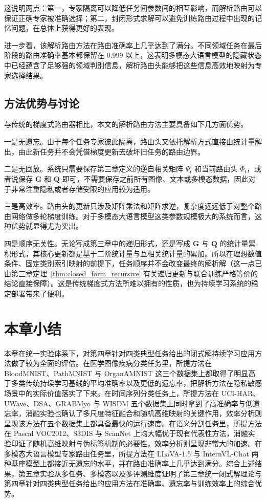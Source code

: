这说明两点：第一，专家隔离可以降低任务间参数间的相互影响，而解析路由可以保证正确专家被准确选择；第二，封闭形式求解可以避免训练路由过程中出现的记忆问题，在总体上获得更好的表现。

进一步看，该解析路由方法在路由准确率上几乎达到了满分。不同领域任务在最后阶段的路由准确率基本都保留在 0.999 以上，这表明多模态大语言模型的隐藏状态中已经蕴含了足够强的领域判别信息，解析路由头能够把这些信息高效地映射为专家选择结果。

\subsection{方法优势与讨论}

与传统的梯度式路由器相比，本文的解析路由方法主要具备如下几方面优势。

一是无遗忘。由于每个任务专家彼此隔离，路由头又依托解析方式直接由统计量解出，由此新任务并不会凭借梯度更新去破坏旧任务的路由边界。

二是无回放。系统只需要保存第三章定义的逆自相关矩阵 $\Psi_t$ 和当前路由头 $\widehat{\Phi}_t$，或者说保存 $\mathbf{G}$ 和 $\mathbf{Q}$ 即可，不需要保存之前所有图像、文本或多模态数据，因此对于非常注重隐私或者存储受限的应用较为适用。

三是高效率。路由头的更新只涉及矩阵乘法和矩阵求逆，复杂度远远低于对整个路由网络做多轮梯度训练。对于多模态大语言模型这类参数规模极大的系统而言，这种优势就显得尤为突出。

四是顺序无关性。无论写成第三章中的递归形式，还是写成 $\mathbf{G}$ 与 $\mathbf{Q}$ 的统计量累积形式，其核心更新都是基于二阶统计量与互相关统计量的累加。所以在理想数值条件、固定类别索引映射的前提下，任务顺序并不会改变最终的解析解（这一点已由第三章定理~\ref{thm:closed_form_recursive} 有关递归更新与联合训练严格等价的结论直接保障）。这是传统梯度式方法所难以拥有的性质，也为持续学习系统的稳定部署带来了便利。

\section{本章小结}

本章在统一实验体系下，对第四章针对四类典型任务给出的闭式解持续学习应用方法做了较为全面的评估。在医学图像疾病分类任务里，所提方法在 BloodMNIST、PathMNIST 与 OrganAMNIST 这三个数据集上都取得了明显高于多类传统持续学习基线的平均准确率以及更低的遗忘率，把解析方法在隐私敏感场景中的实际价值落实了下来。在时间序列分类任务上，所提方法在 UCI-HAR、UWave、DSA、GRABMyo 与 WISDM 五个数据集上同时拿到了高准确率与低遗忘率，消融实验也确认了多尺度特征融合和随机高维映射的关键作用，效率分析则呈现该方法在五个数据集上都具备最快的运行速度。在语义分割任务里，所提方法在 Pascal VOC2012、S3DIS 与 ScanNet 上均大幅优于现有代表性方法，消融实验印证了随机高维映射与伪标签机制的必要性，效率分析则呈现非常大的加速。在多模态大语言模型专家路由任务里，所提方法在 LLaVA-1.5 与 InternVL-Chat 两种基座模型上都接近无遗忘的水平，并在路由准确率上几乎达到满分。综合上述结果，第五章实验从多任务、多模态以及多评测维度证明了第三章统一闭式解理论与第四章针对四类典型任务给出的应用方法在准确率、遗忘率与训练效率上的综合优势。
